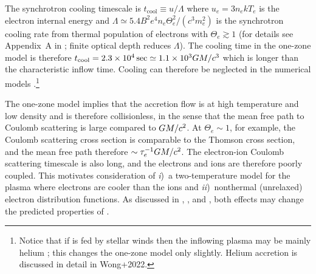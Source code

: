 The synchrotron cooling timescale is $t_\mathrm{cool} \equiv u/\Lambda$ where $u_e = 3 n_e k T_e$ is the electron internal energy and $\Lambda \simeq 5.4 B^2 e^4 n_e \Theta_e^2 /(c^3 m_e^2)$ is the synchrotron cooling rate from thermal population of electrons with $\Theta_e \gtrsim 1$ (for details see Appendix~A in \citealt{2011ApJ...735....9M}; finite optical depth reduces $\Lambda$).
The cooling time in the one-zone model is therefore $t_\mathrm{cool}=2.3 \times 10^4\,\mathrm{sec} \simeq 1.1 \times 10^3 GM/c^3$ which is longer than the characteristic inflow time.
Cooling can therefore be neglected in the numerical models \citep[e.g.,][]{2012MNRAS.426.1928D}.\footnote{Notice that if \sgra is fed by stellar winds then the inflowing plasma may be mainly helium \citep{2019MNRAS.482L.123R}; this changes the one-zone model only slightly. Helium accretion is discussed in detail in Wong+2022.}

The one-zone model implies that the accretion flow is at high temperature and low density and is therefore collisionless, in the sense that the mean free path to Coulomb scattering is large compared to $GM/c^2$.
At $\Theta_e \sim 1$, for example, the Coulomb scattering cross section is comparable to the Thomson cross section, and the mean free path therefore $\sim \tau_e^{-1} GM/c^2$.
The electron-ion Coulomb scattering timescale is also long, and the electrons and ions are therefore poorly coupled.
This motivates consideration of
\emph{i})~a two-temperature model for the plasma where electrons are cooler than the ions \citep{1976ApJ...204..187S,1977ApJ...214..840I, 1982Natur.295...17R} and
\emph{ii})~nonthermal (unrelaxed) electron distribution functions.
As discussed in \citet{2000ApJ...541..234O}, \citet{2009ApJ...701..521C}, and \citet{2014A&A...570A...7M} \citep[see also more recent work by][]{2018A&A...612A..34D,2021arXiv211102518F, 2021NatAs.tmp..218C, 2021arXiv211203933E}, both effects may change the predicted properties of \sgra.

